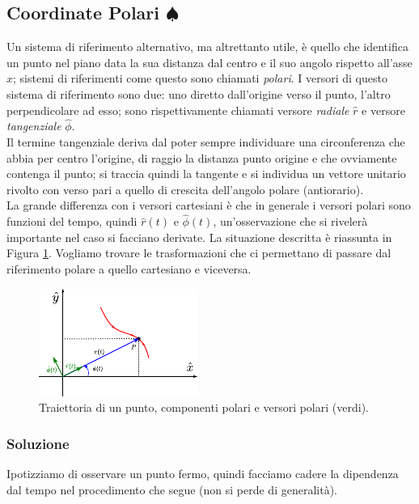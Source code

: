 \documentclass[12pt,a4paper]{book}
\begin{document}
\subsection{Coordinate Polari $\spadesuit$}
\label{subsec:polar}
Un sistema di riferimento alternativo, ma altrettanto utile, è quello che identifica un punto nel piano data la sua distanza dal centro e il suo angolo rispetto all'asse $x$; sistemi di riferimenti come questo sono chiamati \textit{polari}. I versori di questo sistema di riferimento sono due: uno diretto dall'origine verso il punto, l'altro perpendicolare ad esso; sono rispettivamente chiamati versore \textit{radiale} $\hat{r}$ e versore \textit{tangenziale} $\hat{\phi}$.\\
Il termine tangenziale deriva dal poter sempre individuare una circonferenza che abbia per centro l'origine, di raggio la distanza punto origine e che ovviamente contenga il punto; si traccia quindi la tangente e si individua un vettore unitario rivolto con verso pari a quello di crescita dell'angolo polare (antiorario).\\
La grande differenza con i versori cartesiani è che in generale i versori polari sono funzioni del tempo, quindi $\hat{r}(t)$ e $\hat{\phi}(t)$, un'osservazione che si rivelerà importante nel caso si facciano derivate.
La situazione descritta è riassunta in Figura \ref{fig:polar}. Vogliamo trovare le trasformazioni che ci permettano di passare dal riferimento polare a quello cartesiano e viceversa.

\begin{figure}[h]
 \centering
\includegraphics[scale=2.3]{polar.pdf}
 \caption{Traiettoria di un punto, componenti polari e versori polari (verdi).}
 \label{fig:polar}
\end{figure}

\subsubsection*{Soluzione}
Ipotizziamo di osservare un punto fermo, quindi facciamo cadere la dipendenza dal tempo nel procedimento che segue (non si perde di generalità).\\
\end{document}
